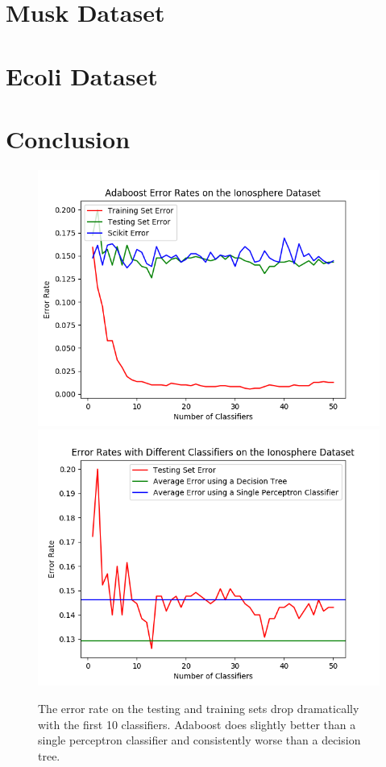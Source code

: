 \documentclass{article}
\begin{document}
\section{Musk Dataset}



\section{Ecoli Dataset}



\section{Conclusion}




 

\begin{figure}[hbt]
\centering
\includegraphics[scale=0.7]{Ionosphere_1}
\includegraphics[scale=0.7]{Ionosphere_different_classifiers_1} 
\caption{The error rate on the testing and training sets drop dramatically with the first 10 classifiers. Adaboost does slightly better than a single perceptron classifier and consistently worse than a decision tree.}
\end{figure}
\end{document}
